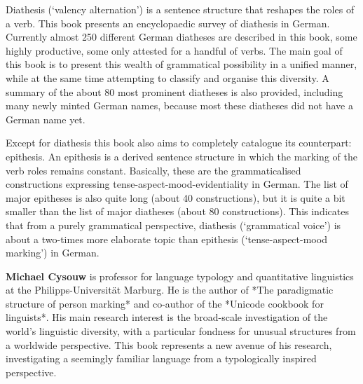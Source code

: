 Diathesis (`valency alternation') is a sentence structure that reshapes the roles of a verb. This book presents an encyclopaedic survey of diathesis in German. Currently almost 250 different German diatheses are described in this book, some highly productive, some only attested for a handful of verbs. The main goal of this book is to present this wealth of grammatical possibility in a unified manner, while at the same time attempting to classify and organise this diversity. A summary of the about 80 most prominent diatheses is also provided, including many newly minted German names, because most these diatheses did not have a German name yet.

Except for diathesis this book also aims to completely catalogue its counterpart: epithesis. An epithesis is a derived sentence structure in which the marking of the verb roles remains constant. Basically, these are the grammaticalised constructions expressing tense-aspect-mood-evidentiality in German. The list of major epitheses is also quite long (about 40 constructions), but it is quite a bit smaller than the list of major diatheses (about 80 constructions). This indicates that from a purely grammatical perspective, diathesis (`grammatical voice') is about a two-times more elaborate topic than epithesis (`tense-aspect-mood marking') in German.

\vspace{1\baselineskip}

\noindent\textbf{Michael Cysouw} is professor for language typology and quantitative linguistics at the Philipps-Universität Marburg. He is the author of *The paradigmatic structure of person marking* and co-author of the *Unicode cookbook for linguists*. His main research interest is the broad-scale investigation of the world's linguistic diversity, with a particular fondness for unusual structures from a worldwide perspective. This book represents a new avenue of his research, investigating a seemingly familiar language from a typologically inspired perspective.
